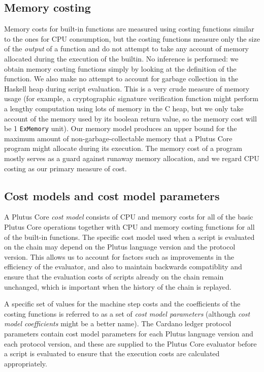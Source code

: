 \documentclass[a4paper]{article}
\begin{document}
\subsection{Memory costing}
Memory costs for built-in functions are measured using costing functions similar
to the ones for CPU consumption, but the costing functions measure only the size
of the \textit{output} of a function and do not attempt to take any account of
memory allocated during the execution of the builtin.  No inference is
performed: we obtain memory costing functions simply by looking at the
definition of the function.  We also make no attempt to account for garbage
collection in the Haskell heap during script evaluation.  This is a very crude
measure of memory usage (for example, a cryptographic signature verification
function might perform a lengthy computation using lots of memory in the C heap,
but we only take account of the memory used by its boolean return value, so the
memory cost will be 1 \texttt{ExMemory} unit).  Our memory model produces an
upper bound for the maximum amount of non-garbage-collectable memory that a
Plutus Core program might allocate during its execution.  The memory cost of a
program mostly serves as a guard against runaway memory allocation, and we
regard CPU costing as our primary measure of cost.

\subsection{Cost models and cost model parameters}
A Plutus Core \textit{cost model} consists of CPU and memory costs for all of
the basic Plutus Core operations together with CPU and memory costing functions
for all of the built-in functions.  The specific cost model used when a script
is evaluated on the chain may depend on the Plutus language version and the
protocol version.  This allows us to account for factors such as improvements in
the efficiency of the evaluator, and also to maintain backwards compatiblity
and ensure that the evaluation costs of scripts already on the chain remain
unchanged, which is important when the history of the chain is replayed.

A specific set of values for the machine step costs and the coefficients of the
costing functions is referred to as a set of \textit{cost model parameters}
(although \textit{cost model coefficients} might be a better name).  The Cardano
ledger protocol parameters contain cost model parameters for each Plutus
language version and each protocol version, and these are supplied to the Plutus
Core evaluator before a script is evaluated to ensure that the execution costs
are calculated appropriately.
\end{document}

